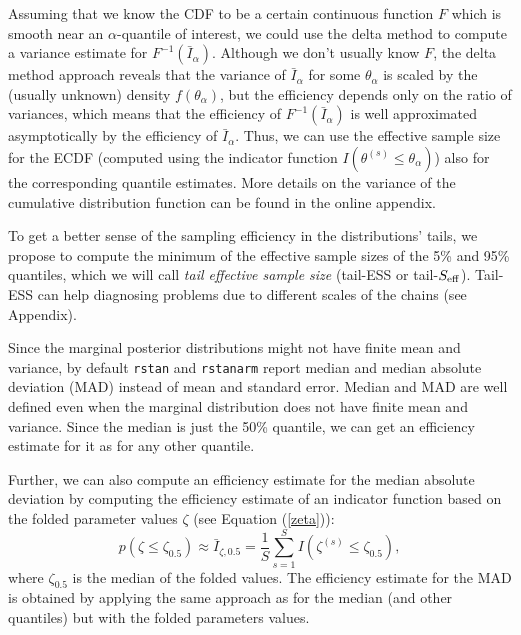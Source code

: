 \documentclass[american,]{article}
\begin{document}
Assuming that we know the CDF to be a certain continuous function \(F\)
which is smooth near an \(\alpha\)-quantile of interest, we could use
the delta method to compute a variance estimate for
\(F^{-1}(\bar{I}_\alpha)\). Although we don't usually know \(F\), the
delta method approach reveals that the variance of \(\bar{I}_\alpha\)
for some \(\theta_\alpha\) is scaled by the (usually unknown) density
\(f(\theta_\alpha)\), but the efficiency depends only on the ratio of variances, which means that the efficiency of \(F^{-1}(\bar{I}_\alpha)\) is well approximated asymptotically by the  efficiency
of \(\bar{I}_\alpha\). Thus, we can use the effective sample size for
the ECDF (computed using the indicator function
\(I(\theta^{(s)} \leq \theta_\alpha)\)) also for the corresponding
quantile estimates. More details on the variance of the cumulative
distribution function can be found in the online appendix.

To get a better sense of the sampling efficiency in the
distributions' tails, we propose to compute the minimum of the effective
sample sizes of the 5\% and 95\% quantiles, which we will call
\emph{tail effective sample size} (tail-ESS or tail-\(S_{\rm eff}\)).
Tail-ESS can help diagnosing problems due to different scales of the
chains (see Appendix).


% 

Since the marginal posterior distributions might not have finite mean
and variance, by default \texttt{rstan} \citep{RStan.2.17} and \texttt{rstanarm}
\citep{RStanARM.2.17} report median and median absolute deviation (MAD)
instead of mean and standard error. Median and MAD are well defined
even when the marginal distribution does not have finite mean and
variance. Since the median is just the 50\% quantile, we can get an
efficiency estimate for it as for any other quantile.

Further, we can also compute an efficiency estimate for the median
absolute deviation by computing the efficiency estimate of an
indicator function based on the folded parameter values \(\zeta\) (see
Equation (\ref{zeta})):
\begin{equation}
p(\zeta \leq \zeta_{0.5}) \approx \bar{I}_{\zeta,0.5} = \frac{1}{S}\sum_{s=1}^S
I(\zeta^{(s)} \leq \zeta_{0.5}),
\end{equation}
where \(\zeta_{0.5}\) is the median of the folded values. The efficiency estimate for the MAD is obtained by applying the same
approach as for the median (and other quantiles) but with the folded
parameters values.
\end{document}

